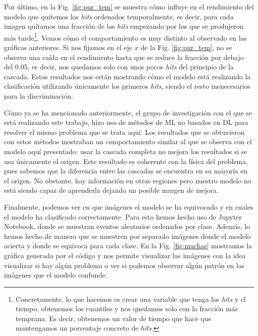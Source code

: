\documentclass[a4paper,12pt,oneside,titlepage]{book}
\begin{document}
Por último, en la Fig. \ref{fig:pur_tem} se muestra cómo influye en el rendimiento del modelo que quitemos los \textit{hits} ordenados temporalmente, es decir, para cada imagen quitamos una fracción de los \textit{hits} empezando por los que se produjeron más tarde\footnote{Concretamente, lo que hacemos es crear una variable que tenga los \textit{hits} y el tiempo, obtenemos los cuantiles y nos quedamos solo con la fracción más temprana. Es decir, obtenemos un valor de tiempo que hace que mantengamos un porcentaje concreto de \textit{hits}.}. Vemos cómo el comportamiento es muy distinto al observado en las gráficas anteriores. Si nos fijamos en el eje $x$ de la Fig. \ref{fig:pur_tem}, no se observa una caída en el rendimiento hasta que se reduce la fracción por debajo del 0.05, es decir, nos quedamos solo con unos pocos \textit{hits} del principio de la cascada. Estos resultados nos están mostrando cómo el modelo está realizando la clasificación utilizando únicamente los primeros \textit{hits}, siendo el resto inenecesarios para la discriminación.

Cómo ya se ha mencionado anteriormente, el grupo de investigación con el que se está realizando este trabajo, hizo uso de métodos de ML no basados en DL para resolver el mismo problema que se trata aquí. Los resultados que se obtuvieron con estos métodos mostraban un comportamiento similar al que se observa con el modelo aquí presentado: usar la cascada completa no mejora los resultados si se usa únicamente el origen. Este resultado es coherente con la física del problema, pues sabemos que la diferencia entre las cascadas se encuentra en su mayoría en el origen. No obstante, hay información en otras regiones pero nuestro modelo no está siendo capaz de aprenderla dejando un posible margen de mejora. 
 
Finalmente, podemos ver en que imágenes el modelo se ha equivocado y en cuales el modelo ha clasificado correctamente. Para esto hemos hecho uso de Jupyter Notebook, donde se muestran eventos aleatorios ordenados por clase. Además, lo hemos hecho de manera que se muestren por separado imágenes donde el modelo acierta y donde se equivoca para cada clase. En la Fig. \ref{fig:muchas} mostramos la gráfica generada por el código y nos permite visualizar las imágenes con la idea visualizar si hay algún problema o ver si podemos observar algún patrón en las imágenes que el modelo confunde.
\end{document}
